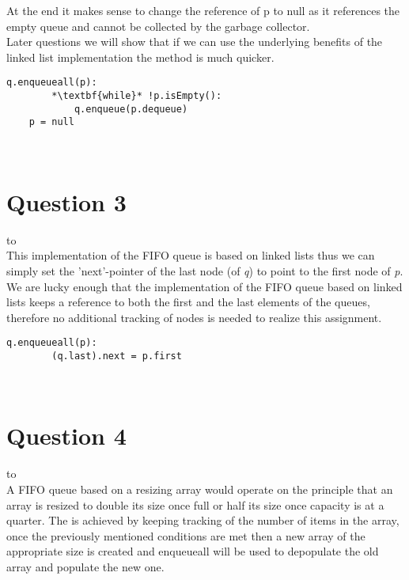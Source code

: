 \documentclass[a4paper]{article}
\def\headline#1{\hbox to \hsize{\hrulefill\quad\lower.3em\hbox{#1}\quad\hrulefill}}
\begin{document}
\noindent
At the end it makes sense to change the reference of p to null as it references the empty queue and cannot be collected by the garbage collector. 
\ \\

\noindent
Later questions we will show that if we can use the underlying benefits of the linked list implementation the method is much quicker.
 \\

\noindent

\begin{lstlisting}[escapeinside={{*}{*}}]
    q.enqueueall(p):
        *\textbf{while}* !p.isEmpty():
            q.enqueue(p.dequeue)
    p = null
\end{lstlisting}

\ \\
\section*{Question 3}
\headline{-} \ \\
This implementation of the FIFO queue is based on linked lists thus we can simply set the 
'next'-pointer of the last node (of \textit{q}) to point to the first node of \textit{p}.
\\

\noindent
We are lucky enough that the implementation of the FIFO queue based on linked lists keeps a reference to both the first and the last elements of the queues, therefore no additional tracking of nodes is needed to realize this assignment.
 \\

\noindent

\begin{lstlisting}[escapeinside={{*}{*}}]
    q.enqueueall(p):
        (q.last).next = p.first
\end{lstlisting}
 
\ \\

\newpage
\section*{Question 4}
\headline{-} \ \\
A FIFO queue based on a resizing array would operate on the principle that an array is resized 
to double its size once full or half its size once capacity is at a quarter. The is achieved by keeping tracking of 
the number of items in the array, once the previously mentioned conditions are met then a new array 
of the appropriate size is created and enqueueall will be used to depopulate the old array and populate the new one.
\\
\end{document}
